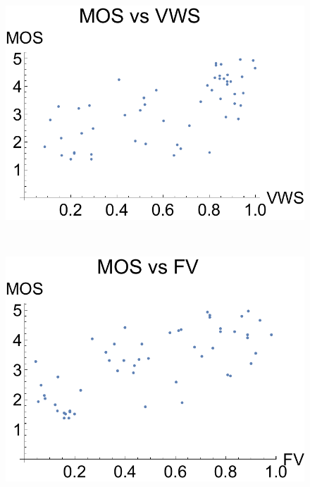 \begin{figure}
	\centering
	\begin{minipage}{.33\textwidth}
		\includegraphics[width=1\linewidth]{figures/mos_vs_vws}
	\end{minipage}~
	\begin{minipage}{.33\textwidth}
		\includegraphics[width=1\linewidth]{figures/mos_vs_visibility}
	\end{minipage}~
	\begin{minipage}{.33\textwidth}

\end{minipage}
\end{figure}
